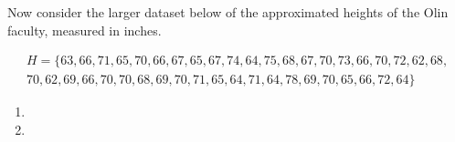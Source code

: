 Now consider the larger dataset below of the approximated heights of the Olin faculty, measured in inches.

\begin{align*}
    H = \{63, 66, 71, 65, 70, 66, 67, 65, 67, 74, 64, 75, 68, 67, 70, 73, 66, 70, 72, 62, 68, \\ 70, 62, 69, 66, 70, 70, 68, 69, 70, 71, 65, 64, 71, 64, 78, 69, 70, 65, 66, 72, 64\}
\end{align*}

\begin{enumerate}
    \item 
    \item 
\end{enumerate}